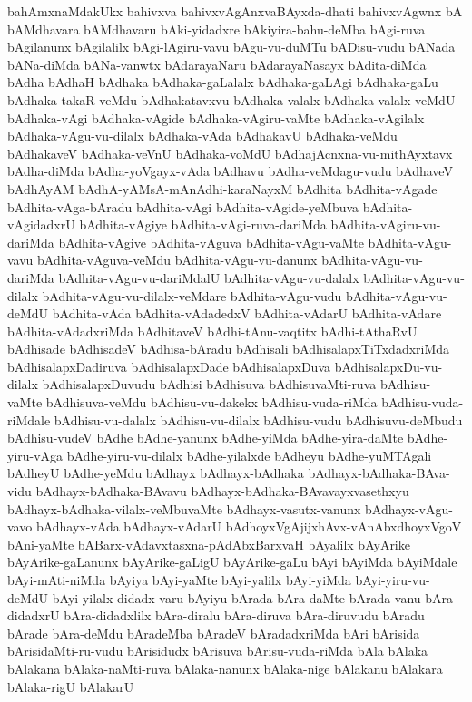 {bahAmxnaMdakUkx
bahivxva
bahivxvAgAnxvaBAyxda-dhati
bahivxvAgwnx
bA
bAMdhavara
bAMdhavaru
bAki-yidadxre
bAkiyira-bahu-deMba
bAgi-ruva
bAgilanunx
bAgilalilx
bAgi-lAgiru-vavu
bAgu-vu-duMTu
bADisu-vudu
bANada
bANa-diMda
bANa-vanwtx
bAdarayaNaru
bAdarayaNasayx
bAdita-diMda
bAdha
bAdhaH
bAdhaka
bAdhaka-gaLalalx
bAdhaka-gaLAgi
bAdhaka-gaLu
bAdhaka-takaR-veMdu
bAdhakatavxvu
bAdhaka-valalx
bAdhaka-valalx-veMdU
bAdhaka-vAgi
bAdhaka-vAgide
bAdhaka-vAgiru-vaMte
bAdhaka-vAgilalx
bAdhaka-vAgu-vu-dilalx
bAdhaka-vAda
bAdhakavU
bAdhaka-veMdu
bAdhakaveV
bAdhaka-veVnU
bAdhaka-voMdU
bAdhajAcnxna-vu-mithAyxtavx
bAdha-diMda
bAdha-yoVgayx-vAda
bAdhavu
bAdha-veMdagu-vudu
bAdhaveV
bAdhAyAM
bAdhA-yAMsA-mAnAdhi-karaNayxM
bAdhita
bAdhita-vAgade
bAdhita-vAga-bAradu
bAdhita-vAgi
bAdhita-vAgide-yeMbuva
bAdhita-vAgidadxrU
bAdhita-vAgiye
bAdhita-vAgi-ruva-dariMda
bAdhita-vAgiru-vu-dariMda
bAdhita-vAgive
bAdhita-vAguva
bAdhita-vAgu-vaMte
bAdhita-vAgu-vavu
bAdhita-vAguva-veMdu
bAdhita-vAgu-vu-danunx
bAdhita-vAgu-vu-dariMda
bAdhita-vAgu-vu-dariMdalU
bAdhita-vAgu-vu-dalalx
bAdhita-vAgu-vu-dilalx
bAdhita-vAgu-vu-dilalx-veMdare
bAdhita-vAgu-vudu
bAdhita-vAgu-vu-deMdU
bAdhita-vAda
bAdhita-vAdadedxV
bAdhita-vAdarU
bAdhita-vAdare
bAdhita-vAdadxriMda
bAdhitaveV
bAdhi-tAnu-vaqtitx
bAdhi-tAthaRvU
bAdhisade
bAdhisadeV
bAdhisa-bAradu
bAdhisali
bAdhisalapxTiTxdadxriMda
bAdhisalapxDadiruva
bAdhisalapxDade
bAdhisalapxDuva
bAdhisalapxDu-vu-dilalx
bAdhisalapxDuvudu
bAdhisi
bAdhisuva
bAdhisuvaMti-ruva
bAdhisu-vaMte
bAdhisuva-veMdu
bAdhisu-vu-dakekx
bAdhisu-vuda-riMda
bAdhisu-vuda-riMdale
bAdhisu-vu-dalalx
bAdhisu-vu-dilalx
bAdhisu-vudu
bAdhisuvu-deMbudu
bAdhisu-vudeV
bAdhe
bAdhe-yanunx
bAdhe-yiMda
bAdhe-yira-daMte
bAdhe-yiru-vAga
bAdhe-yiru-vu-dilalx
bAdhe-yilalxde
bAdheyu
bAdhe-yuMTAgali
bAdheyU
bAdhe-yeMdu
bAdhayx
bAdhayx-bAdhaka
bAdhayx-bAdhaka-BAva-vidu
bAdhayx-bAdhaka-BAvavu
bAdhayx-bAdhaka-BAvavayxvasethxyu
bAdhayx-bAdhaka-vilalx-veMbuvaMte
bAdhayx-vasutx-vanunx
bAdhayx-vAgu-vavo
bAdhayx-vAda
bAdhayx-vAdarU
bAdhoyxVgAjijxhAvx-vAnAbxdhoyxVgoV
bAni-yaMte
bABarx-vAdavxtasxna-pAdAbxBarxvaH
bAyalilx
bAyArike
bAyArike-gaLanunx
bAyArike-gaLigU
bAyArike-gaLu
bAyi
bAyiMda
bAyiMdale
bAyi-mAti-niMda
bAyiya
bAyi-yaMte
bAyi-yalilx
bAyi-yiMda
bAyi-yiru-vu-deMdU
bAyi-yilalx-didadx-varu
bAyiyu
bArada
bAra-daMte
bArada-vanu
bAra-didadxrU
bAra-didadxlilx
bAra-diralu
bAra-diruva
bAra-diruvudu
bAradu
bArade
bAra-deMdu
bAradeMba
bAradeV
bAradadxriMda
bAri
bArisida
bArisidaMti-ru-vudu
bArisidudx
bArisuva
bArisu-vuda-riMda
bAla
bAlaka
bAlakana
bAlaka-naMti-ruva
bAlaka-nanunx
bAlaka-nige
bAlakanu
bAlakara
bAlaka-rigU
bAlakarU
}
